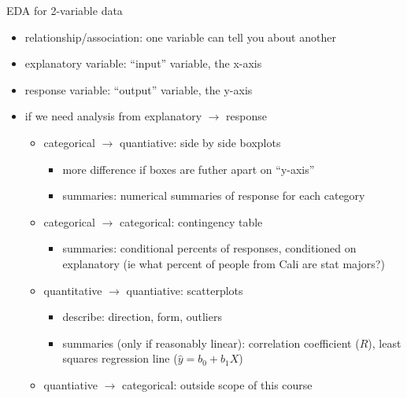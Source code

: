 \documentclass[11pt]{article}
\begin{document}
\newpage
EDA for 2-variable data
\begin{itemize}
  \item relationship/association: one variable can tell you about another
  \item explanatory variable: ``input'' variable, the x-axis
  \item response variable: ``output'' variable, the y-axis
  \item if we need analysis from explanatory $\rightarrow$ response
  \begin{itemize}
    \item categorical $\rightarrow$ quantiative: side by side boxplots
    \begin{itemize}
      \item more difference if boxes are futher apart on ``y-axis''
      \item summaries: numerical summaries of response for each category
    \end{itemize}
    \item categorical $\rightarrow$ categorical: contingency table
    \begin{itemize}
      \item summaries: conditional percents of responses, conditioned on explanatory (ie what percent of people from Cali are stat majors?)
    \end{itemize}
    \item quantitative $\rightarrow$ quantiative: scatterplots
    \begin{itemize}
      \item describe: direction, form, outliers
      \item summaries (only if reasonably linear): correlation coefficient ($R$), least squares regression line ($\hat{y} = b_0 + b_1X$)
    \end{itemize}
    \item quantiative $\rightarrow$ categorical: outside scope of this course 
  \end{itemize}
\end{itemize}
\end{document}
